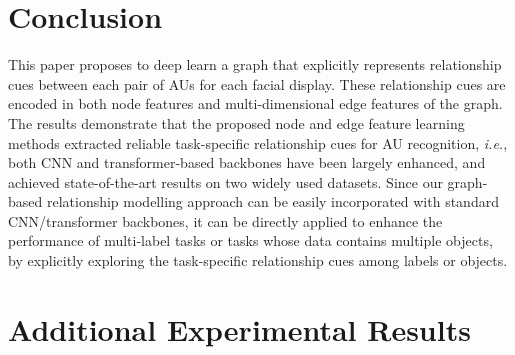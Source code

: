 \documentclass{article}
\begin{document}
\section{Conclusion}


\noindent This paper proposes to deep learn a graph that explicitly represents relationship cues between each pair of AUs for each facial display. These relationship cues are encoded in both node features and multi-dimensional edge features of the graph. The results demonstrate that the proposed node and edge feature learning methods extracted reliable task-specific relationship cues for AU recognition, \emph{i.e.}, both CNN and transformer-based backbones have been largely enhanced, and achieved state-of-the-art results on two widely used datasets. Since our graph-based relationship modelling approach can be easily incorporated with standard CNN/transformer backbones, it can be directly applied to enhance the performance of multi-label tasks or tasks whose data contains multiple objects, by explicitly exploring the task-specific relationship cues among labels or objects. 


\appendix
\section{Additional Experimental Results}\label{sec:ex_ar}

\begin{table}[htb]
    \centering
    \small
    \caption{AUC results achieved for 12 AUs on BP4D dataset.}
    \label{ex:tab_AUC}
\end{table}
\end{document}

